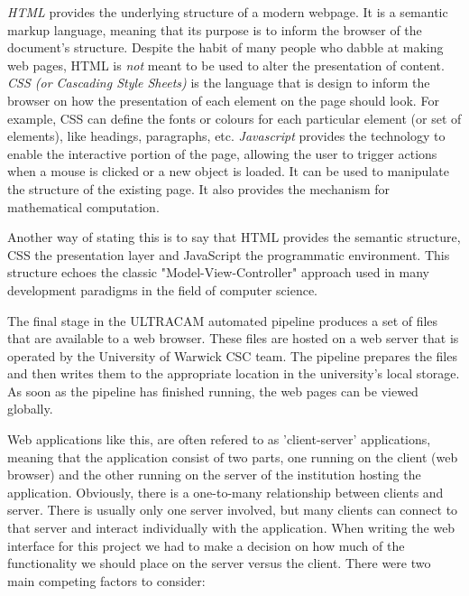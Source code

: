 \emph{HTML} provides the underlying structure of a modern webpage. It is a semantic markup language, meaning that its purpose is to inform the browser of the document's structure. Despite the habit of many people who dabble at making web pages, HTML is \emph{not} meant to be used to alter the presentation of content. \emph{CSS (or Cascading Style Sheets)} is the language that is design to inform the browser on how the presentation of each element on the page should look. For example, CSS can define the fonts or colours for each particular element (or set of elements), like headings, paragraphs, etc. \emph{Javascript} provides the technology to enable the interactive portion of the page, allowing the user to trigger actions when a mouse is clicked or a new object is loaded. It can be used to manipulate the structure of the existing page. It also provides the mechanism for mathematical computation.

Another way of stating this is to say that HTML provides the semantic structure, CSS the presentation layer and JavaScript the programmatic environment. This structure echoes the classic "Model-View-Controller" approach used in many development paradigms in the field of computer science.

The final stage in the ULTRACAM automated pipeline produces a set of files that are available to a web browser. These files are hosted on a web server that is operated by the University of Warwick CSC team. The pipeline prepares the files and then writes them to the appropriate location in the university's local storage. As soon as the pipeline has finished running, the web pages can be viewed globally. 

\label{sect:clientserver}
Web applications like this, are often refered to as 'client-server' applications, meaning that the application consist of two parts, one running on the client (web browser) and the other running on the server of the institution hosting the application. Obviously, there is a one-to-many relationship between clients and server. There is usually only one server involved, but many clients can connect to that server and interact individually with the application. When writing the web interface for this project we had to make a decision on how much of the functionality we should place on the server versus the client. There were two main competing factors to consider:

